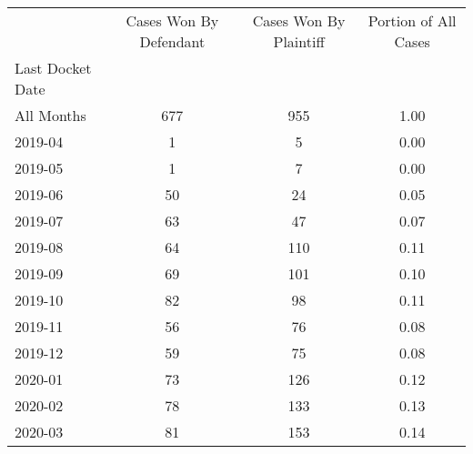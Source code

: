 \begin{tabular}{lccc}
\toprule
 & Cases Won By Defendant & Cases Won By Plaintiff & Portion of All Cases \\
Last Docket Date &  &  &  \\
\midrule
All Months & 677 & 955 & 1.00 \\
2019-04 & 1 & 5 & 0.00 \\
2019-05 & 1 & 7 & 0.00 \\
2019-06 & 50 & 24 & 0.05 \\
2019-07 & 63 & 47 & 0.07 \\
2019-08 & 64 & 110 & 0.11 \\
2019-09 & 69 & 101 & 0.10 \\
2019-10 & 82 & 98 & 0.11 \\
2019-11 & 56 & 76 & 0.08 \\
2019-12 & 59 & 75 & 0.08 \\
2020-01 & 73 & 126 & 0.12 \\
2020-02 & 78 & 133 & 0.13 \\
2020-03 & 81 & 153 & 0.14 \\
\bottomrule
\end{tabular}
